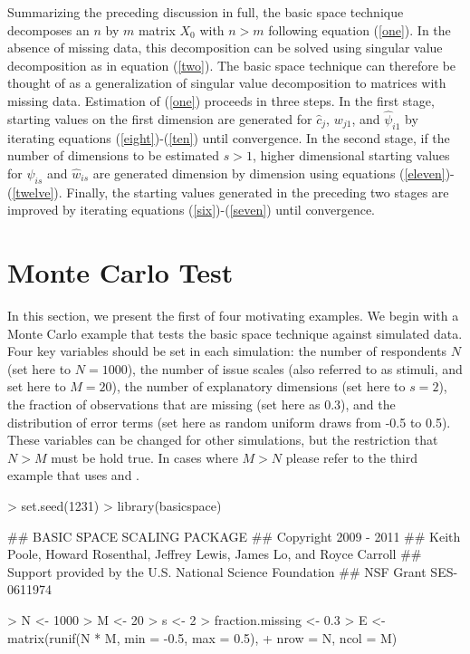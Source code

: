 \documentclass[nojss]{jss}
\begin{document}
Summarizing the preceding discussion in full, the basic space technique decomposes an $n$ by $m$ matrix $X_0$ with
$n > m$ following equation (\ref{one}). In the absence of missing data, this decomposition can be solved using
singular value decomposition as in equation (\ref{two}). The basic space technique can therefore be thought of as
a generalization of singular value decomposition to matrices with missing data. Estimation of (\ref{one}) proceeds
in three steps. In the first stage, starting values on the first dimension are generated for $\hat{c}_{j}$, $w_{j1}$,
and $\hat{\psi}_{i1}$ by iterating equations (\ref{eight})-(\ref{ten}) until convergence. In the second stage, if the
number of dimensions to be estimated $s > 1$, higher dimensional starting values for $\hat{\psi}_{is}$ and $\hat{w}_{is}$
are generated dimension by dimension using equations (\ref{eleven})-(\ref{twelve}). Finally, the starting values generated 
in the preceding two stages are improved by iterating equations (\ref{six})-(\ref{seven}) until convergence.

\section{Monte Carlo Test}

In this section, we present the first of four motivating examples. We begin with a Monte Carlo example that
tests the basic space technique against simulated data. Four key variables should be set in each simulation:
the number of respondents $N$ (set here to $N=1000$), the number of issue scales (also referred to as stimuli,
and set here to $M=20$), the number of explanatory dimensions (set here to $s=2$), the
fraction of observations that are missing (set here as 0.3), and the distribution of error terms (set here as
random uniform draws from -0.5 to 0.5). These variables can be changed for other simulations, but the
restriction that $N>M$ must be hold true. In cases where $M>N$ please refer to the third example that uses
 and .

\begin{Schunk}
\begin{Sinput}
> set.seed(1231)
> library(basicspace)
\end{Sinput}
\begin{Soutput}
## BASIC SPACE SCALING PACKAGE 
## Copyright 2009 - 2011 
## Keith Poole, Howard Rosenthal, Jeffrey Lewis, James Lo, and Royce Carroll
## Support provided by the U.S. National Science Foundation
## NSF Grant SES-0611974
\end{Soutput}
\begin{Sinput}
> N <- 1000
> M <- 20
> s <- 2
> fraction.missing <- 0.3
> E <- matrix(runif(N * M, min = -0.5, max = 0.5), 
+     nrow = N, ncol = M)
\end{Sinput}
\end{Schunk}
\end{document}
